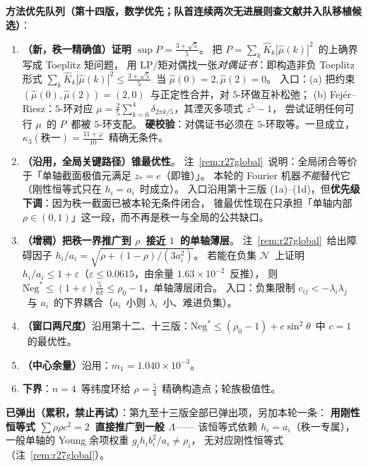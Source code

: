 \documentclass[UTF8,11pt]{ctexart}
\theoremstyle{definition}
\newcommand{\Lam}{\Lambda}
\begin{document}
\textbf{方法优先队列（第十四版，数学优先；队首连续两次无进展则查文献并入队移植候选）}：
\begin{enumerate}\itemsep=2pt
\item[\textbf{P1$'$}]\textbf{（新，秩一精确值）证明 $\sup P=\frac{3+\sqrt5}5$}。
把 $P=\sum_k\widehat K_k|\widehat\mu(k)|^2$~的上确界写成 Toeplitz 矩问题，
用 LP/矩对偶找一张\emph{对偶证书}：即构造非负 Toeplitz 形式
$\sum_k\widehat K_k|\widehat\mu(k)|^2\le\frac{3+\sqrt5}5$~当 $\widehat\mu(0)=2,\widehat\mu(2)=0$。
入口：(a) 把约束 $(\widehat\mu(0),\widehat\mu(2))=(2,0)$~与正定性合并，对 $5$-环做互补松弛；
(b) Fej\'er--Riesz：$5$-环对应 $\mu=\frac25\sum_{k=0}^4\delta_{2\pi k/5}$，其湮灭多项式 $z^5-1$，
尝试证明任何可行 $\mu$~的 $P$~都被 $5$-环支配。
\textbf{硬校验}：对偶证书必须在 $5$-环取等。一旦成立，$\kappa_3(\text{秩一})=\frac{11+\varphi}{10}$~精确无条件。
\item[\textbf{P1}]\textbf{（沿用，全局关键路径）锥最优性}。
注~\ref{rem:r27global}~说明：全局闭合等价于「单轴截面极值元满足 $z_*=e$（即锥）」。
本轮的 Fourier 机器\emph{不能}替代它（刚性恒等式只在 $h_i=a_i$~时成立）。
入口沿用第十三版 (1a)--(1d)，但\textbf{优先级下调}：因为秩一截面已被本轮无条件闭合，
锥最优性现在只承担「单轴内部 $\rho\in(0,1)$」这一段，而不再是秩一与全局的公共缺口。
\item[\textbf{P2}]\textbf{（增稠）把秩一界推广到 $\rho$~接近 $1$~的单轴薄层}。
注~\ref{rem:r27global}~给出障碍因子 $h_i/a_i=\sqrt{\rho+(1-\rho)/(3a_i^2)}$。
若能在负集 $\mathcal N$~上证明 $h_i/a_i\le1+\varepsilon$（$\varepsilon\le0.0615$，由余量 $1.63\times10^{-2}$~反推），
则 $\mathrm{Neg}^*\le(1+\varepsilon)\frac5{6\pi}\le\rho_0-1$，单轴薄层闭合。
入口：负集限制 $c_{ij}<-\lambda_i\lambda_j$~与 $a_i$~的下界耦合（$a_i$~小则 $\lambda_i$~小、难进负集）。
\item[\textbf{P3}]\textbf{（窗口两尺度）}沿用第十二、十三版：$\mathrm{Neg}^*\le(\rho_0-1)+c\sin^2\theta$~中 $c=1$~的最优性。
\item[\textbf{P4}]\textbf{（中心余量）}沿用：$m_1=1.040\times10^{-3}$。
\item[\textbf{副}]\textbf{下界}：$n=4$~等纬度环给 $\rho=\frac54$~精确构造点；轮族极值性。
\end{enumerate}

\textbf{已弹出（累积，禁止再试）}：第九至十三版全部已弹出项，另加本轮一条：
\textbf{用刚性恒等式 $\sum\rho\rho c^2=2$~直接推广到一般 $\Lam$}——
该恒等式依赖 $h_i=a_i$（秩一专属），一般单轴的 Young 余项权重 $g_ih_ib_i^2/a_i\ne\rho_i$，
无对应刚性恒等式（注~\ref{rem:r27global}）。
\end{document}
